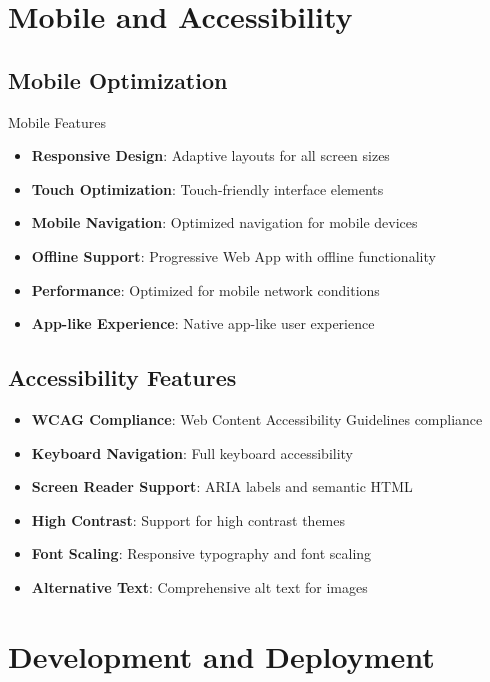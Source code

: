 \documentclass[11pt,a4paper]{article}
\begin{document}
\section{Mobile and Accessibility}

\subsection{Mobile Optimization}

\begin{featurebox}{\faMobile\space Mobile Features}
\begin{itemize}
    \item \textbf{Responsive Design}: Adaptive layouts for all screen sizes
    \item \textbf{Touch Optimization}: Touch-friendly interface elements
    \item \textbf{Mobile Navigation}: Optimized navigation for mobile devices
    \item \textbf{Offline Support}: Progressive Web App with offline functionality
    \item \textbf{Performance}: Optimized for mobile network conditions
    \item \textbf{App-like Experience}: Native app-like user experience
\end{itemize}
\end{featurebox}

\subsection{Accessibility Features}

\begin{itemize}
    \item \textbf{WCAG Compliance}: Web Content Accessibility Guidelines compliance
    \item \textbf{Keyboard Navigation}: Full keyboard accessibility
    \item \textbf{Screen Reader Support}: ARIA labels and semantic HTML
    \item \textbf{High Contrast}: Support for high contrast themes
    \item \textbf{Font Scaling}: Responsive typography and font scaling
    \item \textbf{Alternative Text}: Comprehensive alt text for images
\end{itemize}

\section{Development and Deployment}
\end{document}
